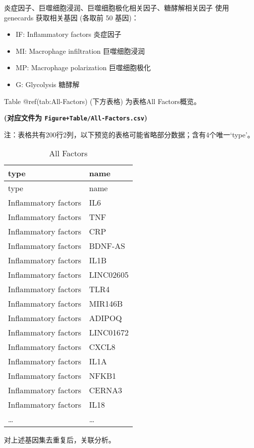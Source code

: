 \documentclass[
  ignorenonframetext,
]{beamer}
\providecommand{\tightlist}{%
  \setlength{\itemsep}{0pt}\setlength{\parskip}{0pt}}
\begin{document}
\begin{frame}[fragile]{炎症因子、巨噬细胞浸润、巨噬细胞极化相关因子、糖酵解相关因子}
\protect\hypertarget{ux708eux75c7ux56e0ux5b50ux5de8ux566cux7ec6ux80deux6d78ux6da6ux5de8ux566cux7ec6ux80deux6781ux5316ux76f8ux5173ux56e0ux5b50ux7cd6ux9175ux89e3ux76f8ux5173ux56e0ux5b50}{}
使用 genecards 获取相关基因 (各取前 50 基因)：

\begin{itemize}
\tightlist
\item
  IF: Inflammatory factors 炎症因子
\item
  MI: Macrophage infiltration 巨噬细胞浸润
\item
  MP: Macrophage polarization 巨噬细胞极化
\item
  G: Glycolysis 糖酵解
\end{itemize}

\begin{center}\vspace{1.5cm}\end{center}

Table @ref(tab:All-Factors) (下方表格) 为表格All Factors概览。

\textbf{(对应文件为 \texttt{Figure+Table/All-Factors.csv})}

\begin{center}\begin{tcolorbox}[colback=gray!10, colframe=gray!50, width=0.9\linewidth, arc=1mm, boxrule=0.5pt]注：表格共有200行2列，以下预览的表格可能省略部分数据；含有4个唯一`type'。
\end{tcolorbox}
\end{center}

\begin{longtable}[]{@{}ll@{}}
\caption{All Factors}\tabularnewline
\toprule
type & name\tabularnewline
\midrule
\endfirsthead
\toprule
type & name\tabularnewline
\midrule
\endhead
Inflammatory factors & IL6\tabularnewline
Inflammatory factors & TNF\tabularnewline
Inflammatory factors & CRP\tabularnewline
Inflammatory factors & BDNF-AS\tabularnewline
Inflammatory factors & IL1B\tabularnewline
Inflammatory factors & LINC02605\tabularnewline
Inflammatory factors & TLR4\tabularnewline
Inflammatory factors & MIR146B\tabularnewline
Inflammatory factors & ADIPOQ\tabularnewline
Inflammatory factors & LINC01672\tabularnewline
Inflammatory factors & CXCL8\tabularnewline
Inflammatory factors & IL1A\tabularnewline
Inflammatory factors & NFKB1\tabularnewline
Inflammatory factors & CERNA3\tabularnewline
Inflammatory factors & IL18\tabularnewline
\ldots{} & \ldots{}\tabularnewline
\bottomrule
\end{longtable}

\begin{center}\vspace{1.5cm}\end{center}

对上述基因集去重复后，关联分析。
\end{frame}
\end{document}
